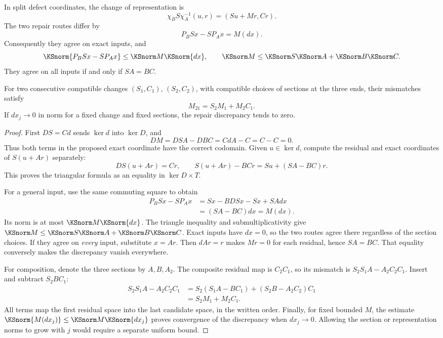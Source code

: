 \begin{KStheorem}\label{KS:KS66}
In split defect coordinates, the change of representation is
\begin{equation}\label{KS:eq:triangular-chart}
 \chi_BS\chi_A^{-1}(u,r)=(Su+Mr,Cr).
\end{equation}
The two repair routes differ by
\begin{equation}\label{KS:eq:repair-change}
 P_BSx-SP_Ax=M(dx).
\end{equation}
Consequently they agree on exact inputs, and
\[
 \KSnorm{P_BSx-SP_Ax}\le\KSnorm M\KSnorm{dx},
 \qquad \KSnorm M\le\KSnorm S\KSnorm A+\KSnorm B\KSnorm C.
\]
They agree on all inputs if and only if \(SA=BC\).

For two consecutive compatible changes \((S_1,C_1)\), \((S_2,C_2)\), with compatible choices of sections at the three ends, their mismatches satisfy
\[
 M_{21}=S_2M_1+M_2C_1.
\]
If \(dx_j\to0\) in norm for a fixed change and fixed sections, the repair discrepancy tends to zero.
\end{KStheorem}
\begin{proof}
First \(DS=Cd\) sends \(\ker d\) into \(\ker D\), and
\[
 DM=DSA-DBC=CdA-C=C-C=0.
\]
Thus both terms in the proposed exact coordinate have the correct codomain. Given \(u\in\ker d\), compute the residual and exact coordinates of \(S(u+Ar)\) separately:
\[
 DS(u+Ar)=Cr,\qquad
 S(u+Ar)-BCr=Su+(SA-BC)r.
\]
This proves the triangular formula as an equality in \(\ker D\times T\).

For a general input, use the same commuting square to obtain
\[
 \begin{aligned}
 P_BSx-SP_Ax
 &=Sx-BDSx-Sx+SAdx\\
 &=(SA-BC)dx=M(dx).
 \end{aligned}
\]
Its norm is at most \(\KSnorm M\KSnorm{dx}\). The triangle inequality and submultiplicativity give \(\KSnorm M\le\KSnorm S\KSnorm A+\KSnorm B\KSnorm C\). Exact inputs have \(dx=0\), so the two routes agree there regardless of the section choices. If they agree on \emph{every} input, substitute \(x=Ar\). Then \(dAr=r\) makes \(Mr=0\) for each residual, hence \(SA=BC\). That equality conversely makes the discrepancy vanish everywhere.

For composition, denote the three sections by \(A,B,A_2\). The composite residual map is \(C_2C_1\), so its mismatch is \(S_2S_1A-A_2C_2C_1\). Insert and subtract \(S_2BC_1\):
\[
 \begin{aligned}
 S_2S_1A-A_2C_2C_1
 &=S_2(S_1A-BC_1)+(S_2B-A_2C_2)C_1\\
 &=S_2M_1+M_2C_1.
 \end{aligned}
\]
All terms map the first residual space into the last candidate space, in the written order. Finally, for fixed bounded \(M\), the estimate \(\KSnorm{M(dx_j)}\le\KSnorm M\KSnorm{dx_j}\) proves convergence of the discrepancy when \(dx_j\to0\). Allowing the section or representation norms to grow with \(j\) would require a separate uniform bound.
\end{proof}
